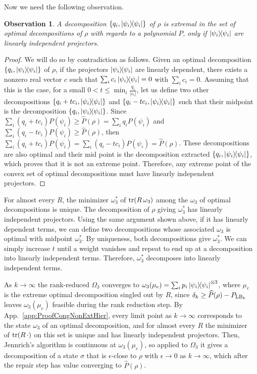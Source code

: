 \documentclass[aps,pra,twocolumn,superscriptaddress]{revtex4-2}
\newtheorem{observation}[theorem]{Observation}
\begin{document}
\begin{widetext}
Now we need the following observation.
\begin{observation}
    A decomposition $\{q_i, \dyad{\psi_i}\}$ of $\rho$ is extremal in the set of optimal decompositions of $\rho$ with regards to a polynomial $P$, only if $\dyad{\psi_i}$ are linearly independent projectors.
\end{observation}
\begin{proof}
We will do so by contradiction as follows. Given an optimal decomposition $\{q_i, \dyad{\psi_i}\}$ of $\rho$, if the projectors $\dyad{\psi_i}$ are linearly dependent, there exists a nonzero real vector $c$ such that $\sum_i c_i \dyad{\psi_i} = 0$ with $\sum_i c_i=0$.
Assuming that this is the case, for a small $0<t\leq \min_i \tfrac{q_i}{|c_i|}$, let us define two other decompositions $\{q_i + t c_i, \dyad{\psi_i}\}$ and $\{q_i - t c_i, \dyad{\psi_i}\}$ such that their midpoint is the decomposition $\{q_i, \dyad{\psi_i}\}$.
Since $\sum_i (q_i+t c_i) P(\psi_i) \geq \widehat{P}(\rho)=\sum_i q_i P(\psi_i)$ and $\sum_i (q_i- t c_i) P(\psi_i) \geq \widehat{P}(\rho)$, then $\sum_i (q_i+ t c_i) P(\psi_i) = \sum_i (q_i- t c_i) P(\psi_i)= \widehat{P}(\rho)$.
These decompositions are also optimal and their mid point is the decomposition extracted $\{q_i, \dyad{\psi_i}\}$, which proves that it is not an extreme point. Therefore, any extreme point of the convex set of optimal decompositions must have linearly independent projectors.
\end{proof}

For almost every $R$, the minimizer $\omega_3^*$ of $\tr(R\,\omega_3)$ among the $\omega_3$ of optimal decompositions is unique. The decomposition of $\rho$ giving $\omega_3^*$ has linearly independent projectors. Using the same argument shown above, if it has linearly dependent terms, we can define two decompositions whose associated $\omega_3$ is optimal with midpoint $\omega_3^*$. By uniqueness, both decompositions give $\omega_3^*$. We can simply increase $t$ until a weight vanishes and repeat to end up at a decomposition into linearly independent terms. Therefore, $\omega_3^*$ decomposes into linearly independent terms.

As $k\to\infty$ the rank-reduced $\Omega_3$ converges to $\omega_3(\mu_e)=\sum_ip_i\dyad{\psi_i}^{\otimes3}$, where
$\mu_e$ is the extreme optimal decomposition singled out by $R$, since $\delta_k \geq \widehat{P}(\rho)-P_{{\rm LB}_k}$ leaves $\omega_3(\mu_e)$ feasible during the rank reduction step.
By App.~\ref{app:ProofCongNonExtHier}, every limit point as $k\to \infty$ corresponds to the state $\omega_3$ of an optimal decomposition, and for almost every $R$ the minimizer of $\tr(R\,\cdot)$ on this set is unique and has linearly independent projectors.
Then, Jennrich's algorithm is continuous at $\omega_3(\mu_e)$, so applied to $\Omega_3$ it gives a decomposition of a state $\sigma$ that is $\epsilon$-close to $\rho$ with $\epsilon\to0$ as $k\to\infty$, which after the repair step has value converging to $\widehat{P}(\rho)$.


\end{widetext}
\end{document}

